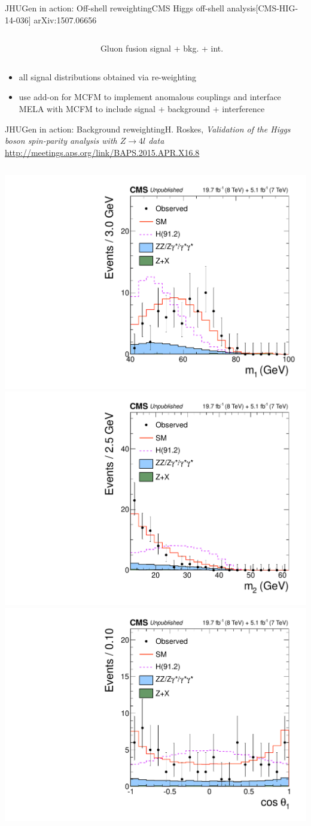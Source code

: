 \documentclass[usenames,dvipsnames,svgnames,table]{beamer}
\begin{document}
\begin{frame}{JHUGen in action: Off-shell reweighting}{CMS Higgs off-shell analysis\hfill [CMS-HIG-14-036] arXiv:1507.06656}
\begin{columns}
\begin{column}{0.75\textwidth}
\end{column}
\begin{column}{0.15\textwidth}
Gluon fusion signal + bkg. + int.
\end{column}
\end{columns}
\begin{itemize} \footnotesize
\item all signal distributions obtained via re-weighting
\item use add-on for MCFM to implement anomalous couplings and interface MELA with MCFM to include signal + background + interference
\end{itemize}
\end{frame}

\begin{frame}{JHUGen in action: Background reweighting}{H. Roskes, \emph{Validation of the Higgs boson spin-parity
analysis with $Z\to 4l$ data}\\ \url{http://meetings.aps.org/link/BAPS.2015.APR.X16.8}}
\begin{columns}
\begin{column}{0.55\textwidth}
\includegraphics[width=.5\columnwidth]{HVV/Z4lm1}
\includegraphics[width=.5\columnwidth]{HVV/Z4lm2} \\
\includegraphics[width=.5\columnwidth]{HVV/Z4lcostheta1}

\end{column}
\end{columns}
\end{frame}
\end{document}
